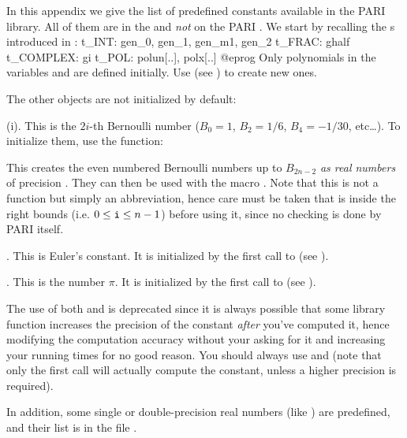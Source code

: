 %
%

In this appendix we give the list of predefined constants available in the
PARI library. All of them are in the  and \emph{not} on the PARI
. We start by recalling the s introduced in
:
%
\bprog
t_INT: gen_0, gen_1, gen_m1, gen_2
t_FRAC: ghalf
t_COMPLEX: gi
t_POL: polun[..], polx[..]
@eprog
\noindent Only polynomials in the variables  and  are
defined initially. Use  (see ) to
create new ones.

\noindent The other objects are not initialized by default:

(i). This is the $2i$-th Bernoulli number ($B_0=1$, $B_2=1/6$,
$B_4=-1/30$, etc\dots). To initialize them, use the function:


This creates the even numbered Bernoulli numbers up to $B_{2n-2}$ 
\emph{as real numbers} of precision . They can then be used with
the macro . Note that this is not a function but simply an
abbreviation, hence care must be taken that  is inside the right
bounds (i.e. $0\le {\tt i}\le n-1$) before using it, since no checking is
done by PARI itself.

. This is Euler's constant. It is initialized by the first call
to  (see ).

. This is the number $\pi$.  It is initialized by the first call to
 (see ).

The use of both  and  is deprecated since it is always
possible that some library function increases the precision of the constant
\emph{after} you've computed it, hence modifying the computation accuracy
without your asking for it and increasing your running times for no good
reason. You should always use  and  (note that only
the first call will actually compute the constant, unless a higher precision
is required).

In addition, some single or double-precision real numbers (like ) are
predefined, and their list is in the file .

